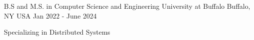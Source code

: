 

\begin{cventries}


  \cventry
    {B.S and M.S. in Computer Science and Engineering} %
    {University at Buffalo} %
    {Buffalo, NY USA} %
    {Jan 2022 - June 2024} %
    {
      \begin{cvitems} %
        \item {Specializing in Distributed Systems}
      \end{cvitems}
    }



\end{cventries}
